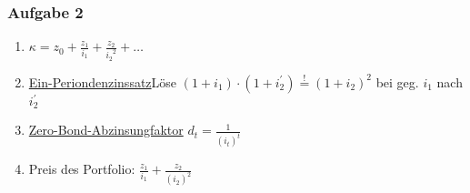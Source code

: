 	\subsubsection*{Aufgabe 2}
	\begin{enumerate}[label=\alph*)]
		\item $\kappa= z_0 + \frac{z_1}{i_1} + \frac{z_2}{{i_2}^2} + \dots$
		\item \hyperref[EinPeriodenzinssatz]{Ein-Periondenzinssatz}Löse $(1+i_1)\cdot (1+i_2^\prime)  \overset{!}{=} (1+i_2)^2$ bei geg. $i_1$ nach $i_2^\prime$
		\item \hyperref[ZeroBondAbzinsungsfaktor]{Zero-Bond-Abzinsungfaktor} $d_t=\frac{1}{(i_t)^t}$
		\item Preis des Portfolio: $\frac{z_1}{i_1}+\frac{z_2}{(i_2)^2}$ 
	\end{enumerate}
	
	